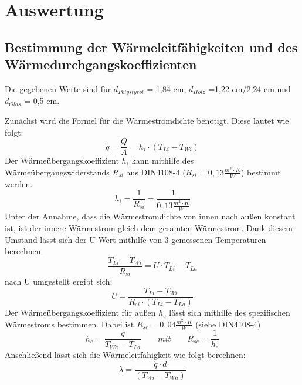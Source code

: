 \section{Auswertung}
\subsection{Bestimmung der Wärmeleitfähigkeiten und des Wärmedurchgangskoeffizienten}
Die gegebenen Werte sind für $d_{Polystyrol}$ = 1,84 cm, $d_{Holz}$ =1,22 cm/2,24 cm und $d_{Glas}$ = 0,5 cm.

Zunächst wird die Formel für die Wärmestromdichte benötigt. Diese lautet wie folgt:
\begin{equation}
\dot q=\frac{ Q }{ A }=h_{ i }\cdot(T_{ Li }-T_{Wi})
  \label{eq:230514_Wärmestromdichte}
\end{equation}
Der Wärmeübergangskoeffizient $h_{i}$ kann mithilfe des Wärmeübergangswiderstands $R_{si}$ aus DIN4108-4 ($R_{si}=0,13 \frac{m^2\cdot K}{W}$) bestimmt werden.
\begin{equation}
h_{i}=\frac{ 1 }{ R_{ si } }=\frac{ 1 }{ 0,13 \frac{m^2\cdot K}{ W }}
  \label{eq:230514_Wärmeübergangskoeffizient}
\end{equation}
Unter der Annahme, dass die Wärmestromdichte von innen nach außen konstant ist, ist der innere Wärmestrom gleich dem gesamten Wärmestrom. Dank diesem Umstand lässt sich der U-Wert mithilfe von 3 gemessenen Temperaturen berechnen.
\begin{equation}
\frac{ T_{Li} - T_{Wi}}{ R_{ si } }=U \cdot T_{Li} - T_{La}
  \label{eq:230514_u1}
\end{equation}
nach U umgestellt ergibt sich: 
\begin{equation}
U = \frac{ T_{Li} - T_{Wi}}{ R_{ si } \cdot  (T_{Li} - T_{La})}
  \label{eq:230514_u2}
\end{equation}
Der Wärmeübergangskoeffizient für außen $h_{e}$ lässt sich mithilfe des spezifischen Wärmestroms bestimmen. Dabei ist $R_{se}=0,04 \frac{ m^2 \cdot K }{W}$ (siehe DIN4108-4)
\begin{equation}
h_{e}=\frac{ q }{ T_{Wa} - T_{La} }   \qquad  mit     \qquad       R_{se}=\frac{ 1 }{ h_{e} }
  \label{eq:230514_h_e}
\end{equation}
Anschließend lässt sich die Wärmeleitfähigkeit wie folgt berechnen:
\begin{equation}
\lambda=\frac{ \dot q \cdot d }{  ( T_{Wi} - T_{Wa} )}
  \label{eq:230514_lamda}
\end{equation}

